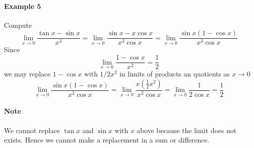 \documentclass[12pt]{article}
\begin{document}
\paragraph{Example 5} Compute 
\[
    \lim_{x \to 0} \frac{\tan x - \sin x}{x^3} = \lim_{x \to 0} \frac{\sin x - x \cos x}{x^3 \cos x} = \lim_{x \to 0} \frac{\sin x (1 -\cos x)}{x^3 \cos x} 
\]
Since 
\[
    \lim_{x \to 0} \frac{1 - \cos x}{x^2} = \frac{1}{2} 
\]
we may replace $1 - \cos x$ with $1/2 x^2$ in limits of products an quotients as $x \to 0$
\[
    \lim_{x \to 0} \frac{\sin x (1 -\cos x)}{x^3 \cos x} = \lim_{x \to 0} \frac{x (\frac{1}{2} x^2)}{x^3 \cos x} = \lim_{x \to 0} \frac{1}{2 \cos x} = \frac{1}{2} 
\]

\paragraph{Note} We cannot replace $\tan x$ and $\sin x$ with $x$ above because the limit does not exists. Hence we cannot make a replacement in a sum or difference.
\end{document}
